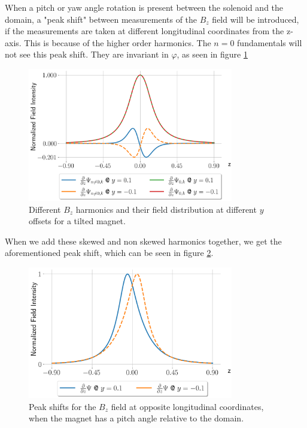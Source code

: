 When a pitch or yaw angle rotation is present between the solenoid and
the domain, a "peak shift" between measurements of the $B_z$
field will be introduced, if the measurements are taken at
different longitudinal coordinates from the z-axis.
This is because of the higher order harmonics. The $n=0$ fundamentals will
not see this peak shift. They are invariant in $\varphi$,
as seen in figure \ref{fig:harmonicsskew}
\begin{figure}[!h]
    \centering
    \includegraphics[width=0.8\textwidth]{figs/harmonicsskew.png}
    \caption{Different $B_z$ harmonics and their field distribution at
        different $y$ offsets for a tilted magnet.}
    \label{fig:harmonicsskew}
\end{figure}

When we add these skewed and non skewed harmonics together, we get the
aforementioned peak shift, which can be seen in figure \ref{fig:mirrored}.

\begin{figure}[!h]
    \centering
    \includegraphics[width=0.8\textwidth]{figs/mirrored}
    \caption{Peak shifts for the $B_z$ field at opposite longitudinal
        coordinates, when the magnet has a pitch angle relative
        to the domain.}
    \label{fig:mirrored}
\end{figure}

